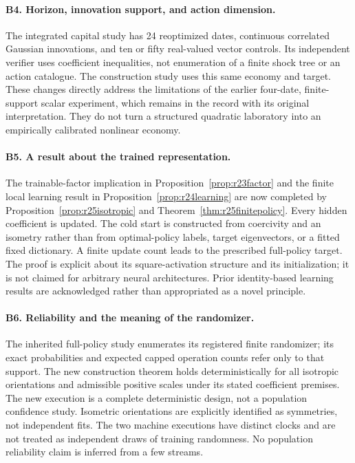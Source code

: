 \paragraph*{B4. Horizon, innovation support, and action dimension.}
The integrated capital study has 24 reoptimized dates, continuous correlated
Gaussian innovations, and ten or fifty real-valued vector controls. Its
independent verifier uses coefficient inequalities, not enumeration of a
finite shock tree or an action catalogue. The construction study uses this
same economy and target. These changes directly address the limitations of
the earlier four-date, finite-support scalar experiment, which remains in
the record with its original interpretation. They do not turn a structured
quadratic laboratory into an empirically calibrated nonlinear economy.

\paragraph*{B5. A result about the trained representation.}
The trainable-factor implication in Proposition~\ref{prop:r23factor} and the
finite local learning result in Proposition~\ref{prop:r24learning} are now
completed by Proposition~\ref{prop:r25isotropic} and
Theorem~\ref{thm:r25finitepolicy}. Every hidden coefficient is updated.
The cold start is constructed from coercivity and an isometry rather than
from optimal-policy labels, target eigenvectors, or a fitted fixed dictionary.
A finite update count leads to the prescribed full-policy target. The proof
is explicit about its square-activation structure and its initialization;
it is not claimed for arbitrary neural architectures. Prior identity-based
learning results are acknowledged rather than appropriated as a novel
principle.

\paragraph*{B6. Reliability and the meaning of the randomizer.}
The inherited full-policy study enumerates its registered finite randomizer;
its exact probabilities and expected capped operation counts refer only to
that support. The new construction theorem holds deterministically for all
isotropic orientations and admissible positive scales under its stated
coefficient premises. The new execution is a complete deterministic design,
not a population confidence study. Isometric orientations are explicitly
identified as symmetries, not independent fits. The two machine executions
have distinct clocks and are not treated as independent draws of training
randomness. No population reliability claim is inferred from a few streams.


